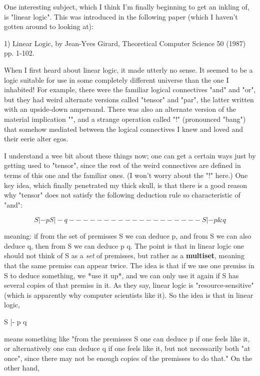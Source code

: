 One interesting subject, which I think I'm finally beginning to get an
inkling of, is "linear logic".  This was introduced in the following
paper (which I haven't gotten around to looking at):

1) Linear Logic, by Jean-Yves Girard, Theoretical Computer Science 50
(1987) pp. 1-102.

When I first heard about linear logic, it made utterly no sense.  It
seemed to be a logic suitable for use in some completely different
universe than the one I inhabited!  For example, there were the familiar
logical connectives "and" and "or", but they had weird alternate
versions called "tensor" and "par", the latter written with an
upside-down ampersand.  There was also an alternate version of 
the material implication "\to ", and a strange operation called "!"
(pronounced "bang") that somehow mediated between the logical
connectives I knew and loved and their eerie alter egos. 

I understand a wee bit about these things now; one can get a certain
ways just by getting used to "tensor", since the rest of the weird
connectives are defined in terms of this one and the familiar ones.
(I won't worry about the "!" here.)  One key idea, which finally
penetrated my thick skull, is that there is a good reason why "tensor"
does not satisfy the following deduction rule so characteristic of "and": 


$$

S |- p       S |- q
-------------------
S |- p \text{\&}  q
$$
    

meaning: if from the set of premisses S we can deduce p, and from S we
can also deduce q, then from S we can deduce p\text{\&} q.  The point is that in
linear logic one should not think of S as a \emph{set} of premisses, but
rather as a \textbf{multiset}, meaning that the same premiss can appear twice.
The idea is that if we use one premiss in S to deduce something, we *use
it up*, and we can only use it again if S has several copies of that
premiss in it.  As they say, linear logic is "resource-sensitive" (which
is apparently why computer scientists like it).  So the idea is that in
linear logic,

S |- p\text{\&} q

means something like "from the premisses S one can deduce p if one feels
like it, or alternatively one can deduce q if one feels like it, but not
necessarily both "at once", since there may not be enough copies of the
premisses to do that."   On the other hand, 

